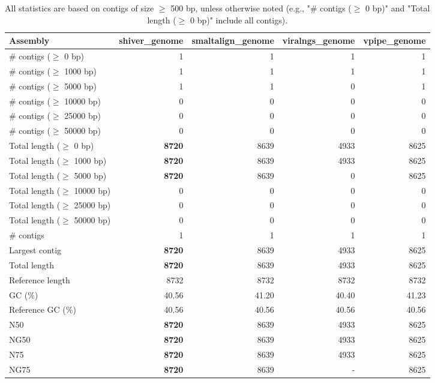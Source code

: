 \documentclass[12pt,a4paper]{article}
\begin{document}
\begin{table}[ht]
\begin{center}
\caption{All statistics are based on contigs of size $\geq$ 500 bp, unless otherwise noted (e.g., "\# contigs ($\geq$ 0 bp)" and "Total length ($\geq$ 0 bp)" include all contigs).}
\begin{tabular}{|l*{4}{|r}|}
\hline
Assembly & shiver\_genome & smaltalign\_genome & viralngs\_genome & vpipe\_genome \\ \hline
\# contigs ($\geq$ 0 bp) & 1 & 1 & 1 & 1 \\ \hline
\# contigs ($\geq$ 1000 bp) & 1 & 1 & 1 & 1 \\ \hline
\# contigs ($\geq$ 5000 bp) & 1 & 1 & 0 & 1 \\ \hline
\# contigs ($\geq$ 10000 bp) & 0 & 0 & 0 & 0 \\ \hline
\# contigs ($\geq$ 25000 bp) & 0 & 0 & 0 & 0 \\ \hline
\# contigs ($\geq$ 50000 bp) & 0 & 0 & 0 & 0 \\ \hline
Total length ($\geq$ 0 bp) & {\bf 8720} & 8639 & 4933 & 8625 \\ \hline
Total length ($\geq$ 1000 bp) & {\bf 8720} & 8639 & 4933 & 8625 \\ \hline
Total length ($\geq$ 5000 bp) & {\bf 8720} & 8639 & 0 & 8625 \\ \hline
Total length ($\geq$ 10000 bp) & 0 & 0 & 0 & 0 \\ \hline
Total length ($\geq$ 25000 bp) & 0 & 0 & 0 & 0 \\ \hline
Total length ($\geq$ 50000 bp) & 0 & 0 & 0 & 0 \\ \hline
\# contigs & 1 & 1 & 1 & 1 \\ \hline
Largest contig & {\bf 8720} & 8639 & 4933 & 8625 \\ \hline
Total length & {\bf 8720} & 8639 & 4933 & 8625 \\ \hline
Reference length & 8732 & 8732 & 8732 & 8732 \\ \hline
GC (\%) & 40.56 & 41.20 & 40.40 & 41.23 \\ \hline
Reference GC (\%) & 40.56 & 40.56 & 40.56 & 40.56 \\ \hline
N50 & {\bf 8720} & 8639 & 4933 & 8625 \\ \hline
NG50 & {\bf 8720} & 8639 & 4933 & 8625 \\ \hline
N75 & {\bf 8720} & 8639 & 4933 & 8625 \\ \hline
NG75 & {\bf 8720} & 8639 & - & 8625 \\ \hline

\end{tabular}
\end{center}
\end{table}
\end{document}
